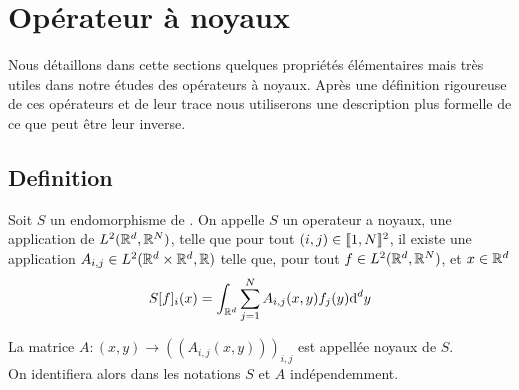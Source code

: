 \documentclass[10pt]{article}
\begin{document}
\begin{multicols}{2}
\begin{equation}
{Il vient directement, par définition de la dérivation au sens de Frechet, $D_f\hat{f} .h = \hat{h}$.  
Ainsi,  $D_f F .h = D_{\hat{f}}F.\hat{h}$.  On peut alors écrire, 
\begin{align}
  \forall h \in U  \quad D_f F .h & = \int_{\R^d} \derd{F}{f(q)} \int_{\R^d} h(x) e^{-iqx} \dd^d x \dd^d q \\
  \forall h \in U  \quad D_f F .h & = \int_{\R^d} \int_{\R^d} \derd{F}{f(q)} e^{-iqx} h(x) \dd^d q \dd^d x \\
  \forall h \in U  \quad D_f F .h & = \int_{\R^d} \int_{\R^d} \derd{F}{f(-q)} e^{iqx} \dd^d q \text{ } h(x) \dd^d x
\end{align}

Ce qui permet de conclure la démonstration.

\vspace*{11pt}

\end{multicols}


\pagebreak

\section{Opérateur à noyaux}

Nous détaillons dans cette sections quelques propriétés élémentaires mais très utiles dans notre études des opérateurs à noyaux. Après une définition rigoureuse de ces opérateurs et de leur trace nous utiliserons une description plus formelle de ce que peut être leur inverse.\\



\subsection{Definition}

Soit $S$ un endomorphisme de . On appelle $S$ un operateur a noyaux, une application de $L^2(\R^d, \R^N)$, telle que pour tout $(i,j) \in \bbrac{1,N}^2$, il existe une application $A_{i,j} \in L^2(\R^d\times\R^d, \R)$ telle que,  pour tout $f \in L^2(\R^d, \R^N)$, et $x \in \R^d$ 
 \begin{equation}
  S[f]_i(x) = \int_{\R^d} \sum_{j=1}^{N} A_{i,j}(x,y)f_j(y) \dd^d y
 \end{equation}

 La matrice $A : (x,y) \rightarrow ((A_{i,j}(x,y)))_{i,j}$ est appellée noyaux de $S$. \\
 On identifiera alors dans les notations $S$ et $A$ indépendemment. \\
\end{document}
